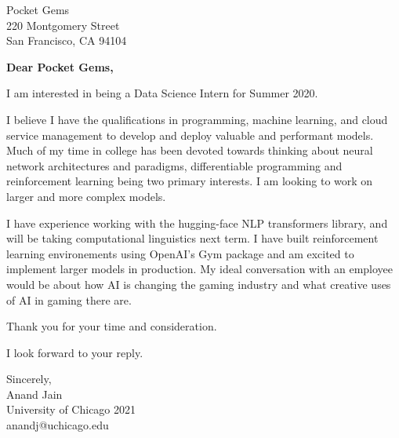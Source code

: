 \documentclass[11pt,a4paper]{letter} %
\begin{document}
\begin{letter}{Pocket Gems \\ 220 Montgomery Street \\ San Francisco, CA 94104} 

\opening{\textbf{Dear Pocket Gems,}}

I am interested in being a Data Science Intern for Summer 2020.

I believe I have the qualifications in programming, machine learning, and cloud service management to develop and deploy valuable and performant models.
Much of my time in college has been devoted towards thinking about neural network architectures and paradigms, differentiable programming and reinforcement learning being two primary interests. 
I am looking to work on larger and more complex models.

I have experience working with the hugging-face NLP transformers library, and will be taking computational linguistics next term.
I have built reinforcement learning environements using OpenAI's Gym package and am excited to implement larger models in production.
My ideal conversation with an employee would be about how AI is changing the gaming industry and what creative uses of AI in gaming there are.

Thank you for your time and consideration.

I look forward to your reply.

\closing{Sincerely, \\ Anand Jain \\ University of Chicago 2021 \\ anandj@uchicago.edu}

\end{letter}
 
\end{document}
